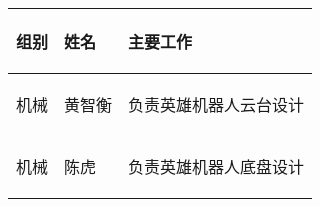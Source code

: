 
\begin{longtable}{ p{2cm} | p{3.5cm} | p{9.3cm} |}

    \hline

    \endfoot
    
    \rowcolor{tabhdcolor}

        \begin{center}
            组别
        \end{center} &
        \begin{center}
            姓名
        \end{center} &
        \begin{center}
            主要工作
        \end{center} \\

    \hline

    \endhead

        \begin{center}
            机械
        \end{center} &
        \begin{center}
            黄智衡
        \end{center} &
        \begin{center}
            负责英雄机器人云台设计
        \end{center}  \\
        
    \hline
        \begin{center}
            机械
        \end{center}&
        \begin{center}
            陈虎
        \end{center}&
        \begin{center}
            负责英雄机器人底盘设计
        \end{center}\\
        

\end{longtable}
